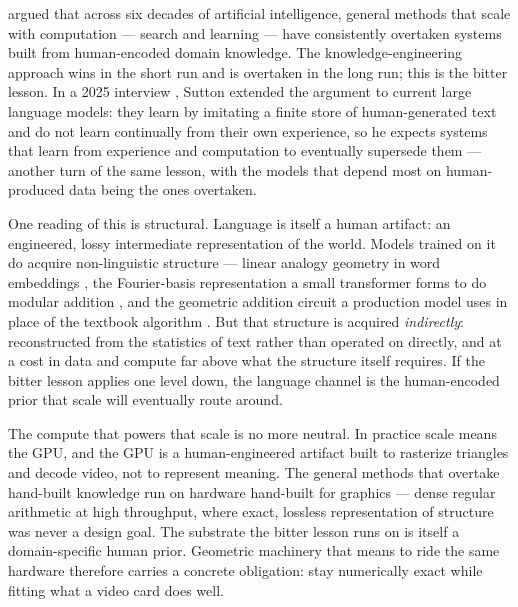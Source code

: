 \documentclass{article}
\begin{document}
\citet{sutton2019bitter} argued that across six decades of artificial
intelligence, general methods that scale with computation --- search and
learning --- have consistently overtaken systems built from
human-encoded domain knowledge. The knowledge-engineering approach wins
in the short run and is overtaken in the long run; this is the bitter
lesson. In a 2025 interview \citep{sutton2025dwarkesh}, Sutton extended
the argument to current large language models: they learn by imitating a
finite store of human-generated text and do not learn continually from
their own experience, so he expects systems that learn from experience
and computation to eventually supersede them --- another turn of the
same lesson, with the models that depend most on human-produced data
being the ones overtaken.

One reading of this is structural. Language is itself a human artifact:
an engineered, lossy intermediate representation of the world. Models
trained on it do acquire non-linguistic structure --- linear analogy
geometry in word embeddings \citep{mikolov2013linguistic}, the
Fourier-basis representation a small transformer forms to do modular
addition \citep{nanda2023progress}, and the geometric addition circuit a
production model uses in place of the textbook algorithm
\citep{lindsey2025biology}. But that structure is acquired
\emph{indirectly}: reconstructed from the statistics of text rather than
operated on directly, and at a cost in data and compute far above what
the structure itself requires. If the bitter lesson applies one level
down, the language channel is the human-encoded prior that scale will
eventually route around.

The compute that powers that scale is no more neutral. In practice scale
means the GPU, and the GPU is a human-engineered artifact built to
rasterize triangles and decode video, not to represent meaning. The
general methods that overtake hand-built knowledge run on hardware
hand-built for graphics --- dense regular arithmetic at high throughput,
where exact, lossless representation of structure was never a design
goal. The substrate the bitter lesson runs on is itself a domain-specific
human prior. Geometric machinery that means to ride the same hardware
therefore carries a concrete obligation: stay numerically exact while
fitting what a video card does well.
\end{document}
